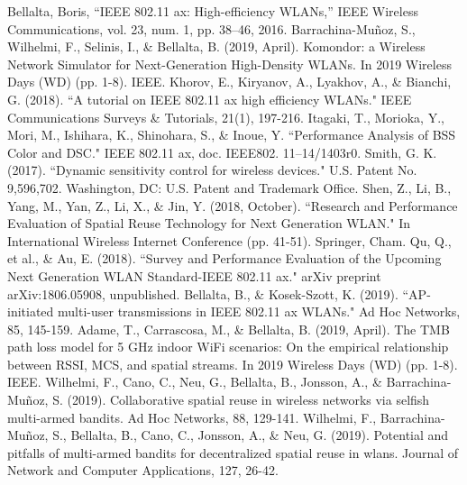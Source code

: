\documentclass{article}
\begin{document}
	\begin{thebibliography}{00}
		 Bellalta, Boris, ``IEEE 802.11 ax: High-efficiency WLANs,'' IEEE Wireless Communications, vol. 23, num. 1, pp. 38--46, 2016.
		 Barrachina-Mu\~noz, S., Wilhelmi, F., Selinis, I., \& Bellalta, B. (2019, April). Komondor: a Wireless Network Simulator for Next-Generation High-Density WLANs. In 2019 Wireless Days (WD) (pp. 1-8). IEEE.
		 Khorov, E., Kiryanov, A., Lyakhov, A., \& Bianchi, G. (2018). ``A tutorial on IEEE 802.11 ax high efficiency WLANs." IEEE Communications Surveys \& Tutorials, 21(1), 197-216.
		 Itagaki, T., Morioka, Y., Mori, M., Ishihara, K., Shinohara, S., \& Inoue, Y. ``Performance Analysis of BSS Color and DSC." IEEE 802.11 ax, doc. IEEE802. 11–14/1403r0. 
		 Smith, G. K. (2017). ``Dynamic sensitivity control for wireless devices." U.S. Patent No. 9,596,702. Washington, DC: U.S. Patent and Trademark Office.
		 Shen, Z., Li, B., Yang, M., Yan, Z., Li, X., \& Jin, Y. (2018, October). ``Research and Performance Evaluation of Spatial Reuse Technology for Next Generation WLAN." In International Wireless Internet Conference (pp. 41-51). Springer, Cham.
		 Qu, Q., et al., \& Au, E. (2018). ``Survey and Performance Evaluation of the Upcoming Next Generation WLAN Standard-IEEE 802.11 ax." arXiv preprint arXiv:1806.05908, unpublished.
		 Bellalta, B., \& Kosek-Szott, K. (2019). ``AP-initiated multi-user transmissions in IEEE 802.11 ax WLANs." Ad Hoc Networks, 85, 145-159.
		 Adame, T., Carrascosa, M., \& Bellalta, B. (2019, April). The TMB path loss model for 5 GHz indoor WiFi scenarios: On the empirical relationship between RSSI, MCS, and spatial streams. In 2019 Wireless Days (WD) (pp. 1-8). IEEE.
		 Wilhelmi, F., Cano, C., Neu, G., Bellalta, B., Jonsson, A., \& Barrachina-Mu\~noz, S. (2019). Collaborative spatial reuse in wireless networks via selfish multi-armed bandits. Ad Hoc Networks, 88, 129-141.
		 Wilhelmi, F., Barrachina-Mu\~noz, S., Bellalta, B., Cano, C., Jonsson, A., \& Neu, G. (2019). Potential and pitfalls of multi-armed bandits for decentralized spatial reuse in wlans. Journal of Network and Computer Applications, 127, 26-42.
	\end{thebibliography}
	
\end{document}

